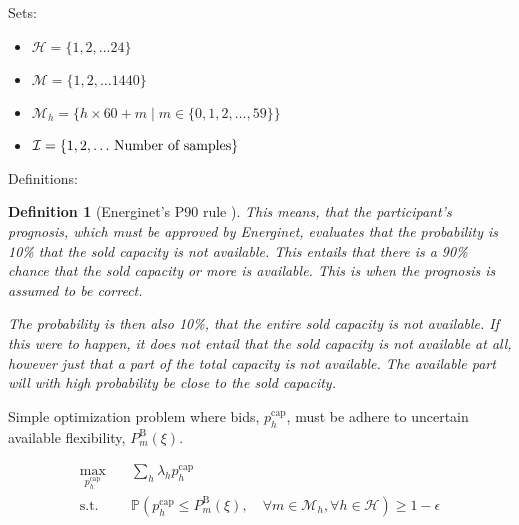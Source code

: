 \documentclass{report}
\newtheorem{definition}{Definition}
\begin{document}
\noindent Sets:

\begin{itemize}
    \item $\mathcal{H} = \{1, 2,  \ldots 24\}$
    \item $\mathcal{M} = \{1, 2,  \ldots 1440\}$
    \item $ \mathcal{M}_{h} = \{h \times 60 + m \mid m \in \{0, 1, 2, \ldots, 59\}\}$
     \item $\mathcal{I} = \{1, 2, \ldots \thinspace \text{Number of samples} \}$

\end{itemize}

\noindent Definitions:

\begin{definition}[Energinet's P90 rule \cite{energinet}]
    This means, that the participant's prognosis, which must be approved by Energinet, evaluates that the probability is 10\% that the sold capacity is not available. This entails that there is a 90\% chance that the sold capacity or more is available. This is when the prognosis is assumed to be correct.

    The probability is then also 10\%, that the entire sold capacity is not available. If this were to happen, it does not entail that the sold capacity is not available at all, however just that a part of the total capacity is not available. The available part will with high probability be close to the sold capacity.
\end{definition}

Simple optimization problem where bids, $p_{h}^{\text{cap}}$, must be adhere to uncertain available flexibility, $P_{m}^{\text{B}}(\xi)$.

\begin{subequations}\label{P90:P1}
    \begin{align}
        \max_{p_{h}^{\text{cap}}} \quad & \sum_h \lambda_h p_{h}^{\text{cap}}                                                                                                                                                                                                     \\
        \text{s.t.} \quad               & \mathbb{P}  \left( p_{h}^{\text{cap}} \leq P_{m}^{\text{B}}(\xi), \quad \forall{m} \in \mathcal{M}_{h},  \forall{h} \in \mathcal{H}  \right) \geq 1 - \epsilon \label{P90:p1:c}
    \end{align}
\end{subequations}
\end{document}
